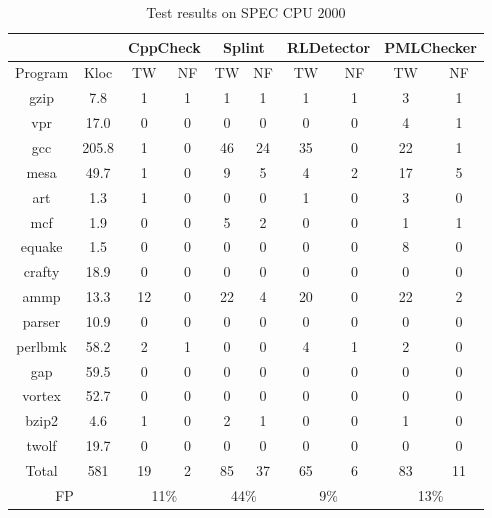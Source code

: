 \begin{table}[!h]
\centering
\setlength{\abovecaptionskip}{0pt}%
\setlength{\belowcaptionskip}{10pt}%
\caption{Test results on SPEC CPU $2000$}\label{tab:4}
\centering
\begin{tabular}{|c|c|c|c|c|c|c|c|c|c|}
\hline
&  & \multicolumn{2}{|c|}{\textbf\small{CppCheck}} & \multicolumn{2}{|c|}{\textbf\small{Splint}} &          \multicolumn{2}{|c|}{\textbf\small{RLDetector}} & \multicolumn{2}{|c|}{\textbf\small{PMLChecker}}\\
\hline
\textbf\small{Program} & \textbf\small{Kloc} & \textbf\small{TW} & \textbf\small{NF} & \textbf\small{TW} & \textbf\small{NF} & \textbf\small{TW} &   \textbf\small{NF} & \textbf\small{TW} & \textbf\small{NF}\\
\hline
gzip       & 7.8    & 1  & 1 & 1	& 1   & 1   & 1  & 3  & 1\\
\hline
vpr        & 17.0   & 0  & 0 & 0	 & 0   & 0  &	0  &	4   &1\\
\hline
gcc        & 205.8 & 1  & 0 & 46 & 24 & 35 &	0  & 22 & 1\\
\hline
mesa     & 49.7   & 1  & 0 & 9	 & 5	   & 4  & 2  & 17 & 5\\
\hline
art         & 1.3     & 1  & 0 &0   & 0	   & 1  &	0   & 3  & 0\\
\hline
mcf        & 1.9     & 0  & 0 & 5  &  2  & 0   & 0  & 1  & 1\\
\hline
equake   & 1.5     & 0  & 0 & 0	 & 0   &	0  & 0   & 8  & 0\\
\hline
crafty     & 18.9   & 0	 & 0	 & 0	 & 0	  & 0   & 0   & 0   & 0\\
\hline
ammp    & 13.3   & 12 & 0 & 22 & 4  & 	20 & 0  & 22 & 2\\
\hline
parser    & 10.9   & 0	 & 0	 & 0	   &0  & 0    & 0  & 0  & 0\\
\hline
perlbmk & 58.2   & 2   & 1	 & 0	   & 0  &	4   & 1  & 2  & 0\\
\hline
gap        & 59.5   &  0 & 0 & 0    & 	0  &	0   & 0   & 0	& 0\\
\hline
vortex    & 52.7    & 0	 & 0	 & 0	   & 0  &	0   & 0   & 0	& 0\\
\hline 
bzip2     & 4.6      & 1 & 0	 & 2	   & 1  &	0   & 0   & 1	& 0\\
\hline
twolf     & 19.7     & 0 & 0	 & 0	   & 0  &	0   & 0   & 0	& 0\\
\hline
Total     & 581      & 19 & 2 & 85 &	37 & 65 & 6	& 83 & 11\\
\hline
\multicolumn{2}{|c|}{FP} & \multicolumn{2}{|c|}{11\%} & \multicolumn{2}{|c|}{44\%} & \multicolumn{2}{|c|}{9\%}  &\multicolumn{2}{|c|}{13\%}\\
\hline
\end{tabular}
\end{table}

